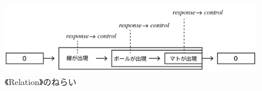 
\begin{figure}[H]
  \centering
  \includegraphics[width=15cm]{img/nerai_rl.png}
  \caption{《Relation》のねらい}
  \label{fig:nerai_rl}
\end{figure}



